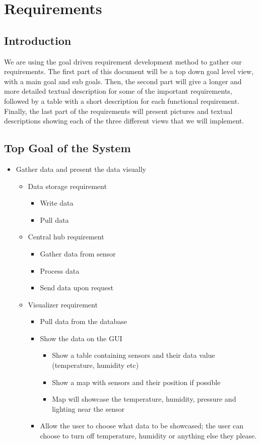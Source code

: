 \documentclass[../document]{subfiles}
\begin{document}
\section{Requirements}
\label{requirements}

\subsection{Introduction}
We are using the goal driven requirement development method to gather our requirements. The first part of this document will be a top down goal level view, with a main goal and sub goals. Then, the second part will give a longer and more detailed textual description for some of the important requirements, followed by a table with a short description for each functional requirement. Finally, the last part of the requirements will present pictures and textual descriptions showing each of the three different views that we will implement.

\subsection{Top Goal of the System}
\begin{itemize}
\item
Gather data and present the data visually
\begin{itemize}
\item
Data storage requirement
\begin{itemize}
\item
Write data
\item
Pull data
\end{itemize}
\item
Central hub requirement
\begin{itemize}
\item
Gather data from sensor
\item
Process data
\item
Send data upon request
\end{itemize}
\item
Visualizer requirement
\begin{itemize}
\item
Pull data from the database
\item
Show the data on the GUI
\begin{itemize}
\item
Show a table containing sensors and their data value (temperature, humidity etc)
\item
Show a map with sensors and their position if possible
\item
Map will showcase the temperature, humidity, pressure and lighting near the sensor
\end{itemize}
\item
Allow the user to choose what data to be showcased; the user can choose to turn off temperature, humidity or anything else they please.
\end{itemize}
\end{itemize}
\end{itemize}
\end{document}
